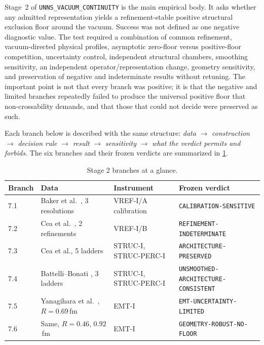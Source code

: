 \documentclass[11pt,a4paper]{article}
\theoremstyle{definition}
\theoremstyle{remark}
\begin{document}
Stage~2 of \texttt{UNNS\_VACUUM\_CONTINUITY} is the main empirical body. It asks whether any admitted representation yields a refinement-stable positive structural exclusion floor around the vacuum. Success was not defined as one negative diagnostic value. The test required a combination of common refinement, vacuum-directed physical profiles, asymptotic zero-floor versus positive-floor competition, uncertainty control, independent structural chambers, smoothing sensitivity, an independent operator/representation change, geometry sensitivity, and preservation of negative and indeterminate results without retuning. The important point is not that every branch was positive; it is that the negative and limited branches repeatedly failed to produce the universal positive floor that non-crossability demands, and that those that could not decide were preserved as such.

Each branch below is described with the same structure: \emph{data} $\to$ \emph{construction} $\to$ \emph{decision rule} $\to$ \emph{result} $\to$ \emph{sensitivity} $\to$ \emph{what the verdict permits and forbids}. The six branches and their frozen verdicts are summarized in \cref{tab:stage2}.

\begin{table}[t]
\centering\small
\caption{Stage 2 branches at a glance.}\label{tab:stage2}
\begin{tabularx}{\textwidth}{@{}l>{\raggedright\arraybackslash}p{3.1cm}>{\raggedright\arraybackslash}p{3.5cm}>{\raggedright\arraybackslash}X@{}}
\toprule Branch & Data & Instrument & Frozen verdict\\\midrule
7.1 & Baker et al.\ \cite{Baker22}, 3 resolutions & VREF-I/A calibration & \texttt{CALIBRATION-\allowbreak{}SENSITIVE}\\
7.2 & Cea et al.\ \cite{Cea17}, 2 refinements & VREF-I/B & \texttt{REFINEMENT-\allowbreak{}INDETERMINATE}\\
7.3 & Cea et al., 5 ladders & STRUC-I, STRUC-PERC-I & \texttt{ARCHITECTURE-\allowbreak{}PRESERVED}\\
7.4 & Battelli--Bonati \cite{Battelli19}, 3 ladders & STRUC-I, STRUC-PERC-I & \texttt{UNSMOOTHED-\allowbreak{}ARCHITECTURE-\allowbreak{}CONSISTENT}\\
7.5 & Yanagihara et al.\ \cite{Yanagihara19}, $R=0.69$\,fm & EMT-I & \texttt{EMT-\allowbreak{}UNCERTAINTY-\allowbreak{}LIMITED}\\
7.6 & Same, $R=0.46,\,0.92$\,fm & EMT-I & \texttt{GEOMETRY-\allowbreak{}ROBUST-\allowbreak{}NO-\allowbreak{}FLOOR}\\\bottomrule
\end{tabularx}
\end{table}
\end{document}
